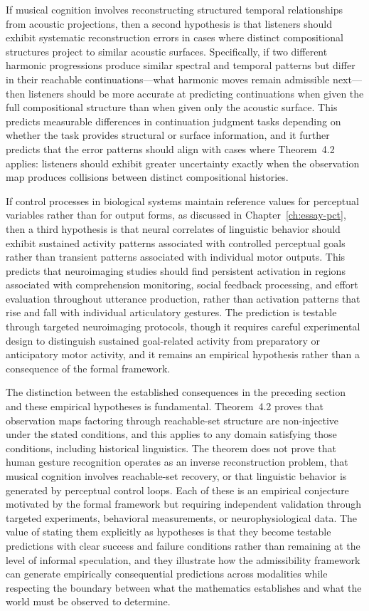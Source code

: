 If musical cognition involves reconstructing structured temporal relationships from acoustic projections, then a second hypothesis is that listeners should exhibit systematic reconstruction errors in cases where distinct compositional structures project to similar acoustic surfaces. Specifically, if two different harmonic progressions produce similar spectral and temporal patterns but differ in their reachable continuations—what harmonic moves remain admissible next—then listeners should be more accurate at predicting continuations when given the full compositional structure than when given only the acoustic surface. This predicts measurable differences in continuation judgment tasks depending on whether the task provides structural or surface information, and it further predicts that the error patterns should align with cases where Theorem~4.2 applies: listeners should exhibit greater uncertainty exactly when the observation map produces collisions between distinct compositional histories.

If control processes in biological systems maintain reference values for perceptual variables rather than for output forms, as discussed in Chapter~\ref{ch:essay-pct}, then a third hypothesis is that neural correlates of linguistic behavior should exhibit sustained activity patterns associated with controlled perceptual goals rather than transient patterns associated with individual motor outputs. This predicts that neuroimaging studies should find persistent activation in regions associated with comprehension monitoring, social feedback processing, and effort evaluation throughout utterance production, rather than activation patterns that rise and fall with individual articulatory gestures. The prediction is testable through targeted neuroimaging protocols, though it requires careful experimental design to distinguish sustained goal-related activity from preparatory or anticipatory motor activity, and it remains an empirical hypothesis rather than a consequence of the formal framework.

The distinction between the established consequences in the preceding section and these empirical hypotheses is fundamental. Theorem~4.2 proves that observation maps factoring through reachable-set structure are non-injective under the stated conditions, and this applies to any domain satisfying those conditions, including historical linguistics. The theorem does not prove that human gesture recognition operates as an inverse reconstruction problem, that musical cognition involves reachable-set recovery, or that linguistic behavior is generated by perceptual control loops. Each of these is an empirical conjecture motivated by the formal framework but requiring independent validation through targeted experiments, behavioral measurements, or neurophysiological data. The value of stating them explicitly as hypotheses is that they become testable predictions with clear success and failure conditions rather than remaining at the level of informal speculation, and they illustrate how the admissibility framework can generate empirically consequential predictions across modalities while respecting the boundary between what the mathematics establishes and what the world must be observed to determine.
